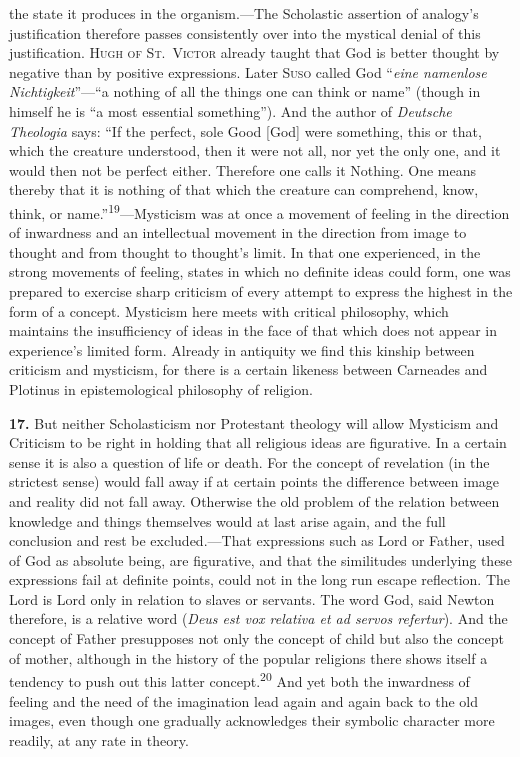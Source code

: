 \documentclass[12pt,a4paper]{book}
\newcommand{\opage}[1]{\marginnote{\footnotesize\textit{[#1]}}}
\begin{document}
the state it produces in the organism.---The Scholastic assertion of analogy's
justification therefore passes consistently over into the mystical denial of
this justification. \textsc{Hugh of St.\ Victor} already taught that God is
better thought by negative than by positive expressions. Later \textsc{Suso}
called God ``\textit{eine namenlose Nichtigkeit}''---``a nothing of all the
things one can think or name'' (though in himself he is ``a most essential
something''). And the author of \emph{Deutsche Theologia} says: ``If the
perfect, sole Good [God] were something, this or that, which the creature
understood, then it were not all, nor yet the only one, and it would then not
be perfect either. Therefore one calls it Nothing. One means thereby that it is
nothing of that which the creature can comprehend, know, think, or
name.''\textsuperscript{19}---Mysticism was at once a movement of feeling in
the direction of inwardness and an intellectual movement in the direction from
image to thought and from thought to thought's limit. In that one experienced,
in the strong movements of feeling, states in which no definite ideas could
form, one was prepared to exercise sharp criticism of every attempt to express
the highest in the form of a concept. Mysticism here meets with critical
philosophy, which maintains the insufficiency of ideas in the face of that
which does not appear in experience's limited form. Already in antiquity we
find this kinship between criticism and mysticism, for there is a certain
likeness between Carneades and Plotinus in epistemological philosophy of
religion.

\medskip

\noindent\textbf{17.} But neither Scholasticism nor Protestant theology will
allow Mysticism and Criticism to be right in holding that all religious ideas
are figurative. In a certain sense it is also a question of life or death. For
the concept of revelation (in the strictest sense) would fall away if at
certain points the difference between image and reality did not fall away.
Otherwise the old problem of the relation between knowledge and things
themselves would at last arise again, and the full conclusion and rest be
excluded.---That expressions such as Lord or Father, used of God as absolute
being, are figurative, and that the similitudes underlying these expressions
fail at definite points, could not in the long run escape reflection. The Lord
is Lord only in relation to slaves or servants. The word God, said 
\opage{44}Newton
therefore, is a relative word (\textit{Deus est vox relativa et ad servos
refertur}). And the concept of Father presupposes not only the concept of
child but also the concept of mother, although in the history of the popular
religions there shows itself a tendency to push out this latter
concept.\textsuperscript{20} And yet both the inwardness of feeling and the
need of the imagination lead again and again back to the old images, even
though one gradually acknowledges their symbolic character more readily, at
any rate in theory.
\end{document}
